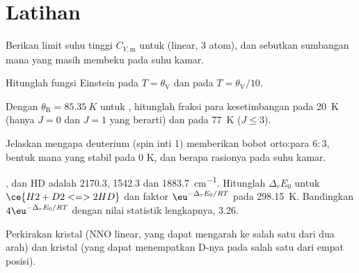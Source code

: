 \section{Latihan}

\begin{exercise}[$\star$]\label{exo:b3:statistical-thermo-applied:1}
Berikan limit suhu tinggi $C_{V,\mathrm m}$ untuk  (linear, 3 atom), dan
sebutkan sumbangan mana yang masih membeku pada suhu kamar.
\end{exercise}

\begin{exercise}[$\star$]\label{exo:b3:statistical-thermo-applied:2}
Hitunglah fungsi Einstein pada $T = \theta_{\mathrm V}$ dan pada $T = \theta_{\mathrm V}/10$.
\end{exercise}

\begin{exercise}[$\star$]\label{exo:b3:statistical-thermo-applied:3}
Dengan $\theta_{\mathrm R} = \qty{85.35}{K}$ untuk , hitunglah fraksi para
kesetimbangan pada \qty{20}{K} (hanya $J = 0$ dan $J = 1$ yang berarti) dan
pada \qty{77}{K} ($J \le 3$).
\end{exercise}

\begin{exercise}[$\star$]\label{exo:b3:statistical-thermo-applied:4}
Jelaskan mengapa deuterium (spin inti 1) memberikan bobot orto:para $6 : 3$,
bentuk mana yang stabil pada 0 K, dan berapa rasionya pada suhu kamar.
\end{exercise}

\begin{exercise}[$\star\star$]\label{exo:b3:statistical-thermo-applied:5}
 ,  dan HD adalah 2170.3, 1542.3 dan
\qty{1883.7}{cm^{-1}}. Hitunglah $\Delta_rE_0$ untuk $\ce{H2 + D2 <=> 2 HD}$ dan faktor
$\eu^{-\Delta_rE_0/RT}$ pada \qty{298.15}{K}. Bandingkan $4\eu^{-\Delta_rE_0/RT}$ dengan
nilai statistik lengkapnya, 3.26.
\end{exercise}

\begin{exercise}[$\star\star$]\label{exo:b3:statistical-thermo-applied:6}
Perkirakan  kristal  (NNO linear, yang dapat mengarah ke
salah satu dari dua arah) dan kristal  (yang dapat menempatkan D-nya
pada salah satu dari empat posisi).
\end{exercise}

